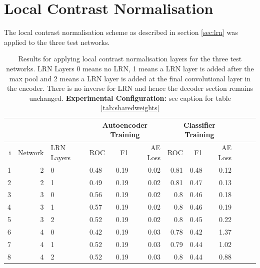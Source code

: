         \section{Local Contrast Normalisation}

          The local contrast normalisation scheme as described in section \ref{sec:lrn}
          was applied to the three test networks.

          \begin{table}[!h] \centering
            \footnotesize{
            \begin{tabular}{rrllrrrrrrrr}
              &&&   \multicolumn{3}{|c|}{Autoencoder Training} &  \multicolumn{3}{c|}{Classifier Training}    \\
            \hline
              i & Network             & LRN Layers   &    ROC&F1&AE Loss & ROC & F1 & AE Loss \\
            \hline
             1 & 2 & 0  &    0.48 &   0.19 &     0.02 &    0.81 &   0.48 &     0.12 \\
             2 & 2 & 1  &    0.49 &   0.19 &     0.02 &    0.81 &   0.47 &     0.13 \\
            \hline
             3 & 3 & 0  &    0.56 &   0.19 &     0.02 &    0.8  &   0.46 &     0.18 \\
             4 & 3 & 1  &    0.57 &   0.19 &     0.02 &    0.8  &   0.46 &     0.19 \\
             5 & 3 & 2  &    0.52 &   0.19 &     0.02 &    0.8  &   0.45 &     0.22 \\
            \hline
             6 & 4 & 0  &    0.42 &   0.19 &     0.03 &    0.78 &   0.42 &     1.37 \\
             7 & 4 & 1  &    0.52 &   0.19 &     0.03 &    0.79 &   0.44 &     1.02 \\
             8 & 4 & 2  &    0.52 &   0.19 &     0.03 &    0.8  &   0.44 &     0.88 \\
            \hline
            \end{tabular}}

            \caption{Results for applying local contrast normalisation layers
            for the three test networks. LRN Layers 0 means no LRN, 1 means a LRN layer is added after the max pool
            and 2 means a LRN layer is added at the final convolutional layer in the encoder. There is no
            inverse for LRN and hence the decoder section remains unchanged. {\bf Experimental Configuration:} see caption
            for table \ref{tab:sharedweights}
            }
            \label{tab:lrn}
          \end{table}

